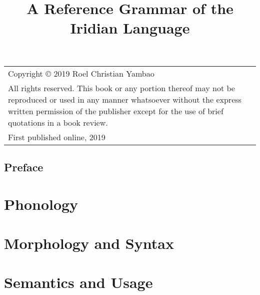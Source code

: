 \documentclass[10pt]{book}
\begin{document}
\author{}
\title{A Reference Grammar of the Iridian Language}
\date{}

\frontmatter
\maketitle
\thispagestyle{empty}

    \vspace*{\fill}
\begin{flushleft}

\begin{tabularx}{\textwidth}{Y}
Copyright © 2019 Roel Christian Yambao\\
\addlinespace
All rights reserved. This book or any portion thereof may not be reproduced or used in any manner whatsoever without the express written permission of the publisher except for the use of brief quotations in a book review.\\
\addlinespace
First published online, 2019	
	
\end{tabularx}

\end{flushleft}


\tableofcontents
\cleardoublepage
\listoftables
\chapter*{Preface}


\mainmatter



\part{Phonology}

\part{Morphology and Syntax}








\part{Semantics and Usage}


\appendix


\end{document}
